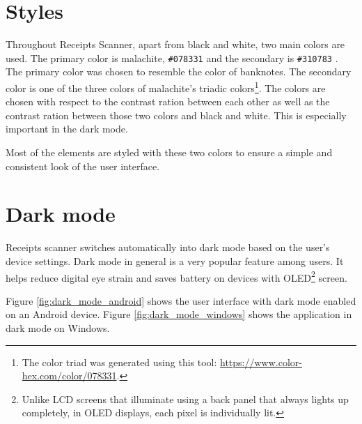 \documentclass[
  digital, %
  table,   %
  oneside, %
  lof,     %
  lot,     %
]{fithesis3}
\makeatletter
\def\testclr#1#{\@testclr{#1}}
\def\@testclr#1#2{{\fboxsep\z@\fbox{\colorbox#1{#2}{\phantom{XX}}}}}
\makeatother
\begin{document}
\chapter{Styles}
Throughout Receipts Scanner, apart from black and white, two main colors are used. The primary color is malachite, \texttt{\#078331}  and the secondary is \texttt{\#310783} . The primary color was chosen to resemble the color of banknotes. The secondary color is one of the three colors of malachite's triadic colors\footnote{The color triad was generated using this tool: \url{https://www.color-hex.com/color/078331}.}. 
The colors are chosen with respect to the contrast ration between each other as well as the contrast ration between those two colors and black and white. This is especially important in the dark mode.

Most of the elements are styled with these two colors to ensure a simple and consistent look of the user interface. 

\chapter{Dark mode}
Receipts scanner switches automatically into dark mode based on the user's device settings. Dark mode in general is a very popular feature among users. It helps reduce digital eye strain and saves battery on devices with OLED\footnote{Unlike LCD screens that illuminate using a back panel that always lights up completely, in OLED displays, each pixel is individually lit.} screen.

Figure \ref{fig:dark_mode_android} shows the user interface with dark mode enabled on an Android device. Figure \ref{fig:dark_mode_windows} shows the application in dark mode on Windows.
\end{document}
